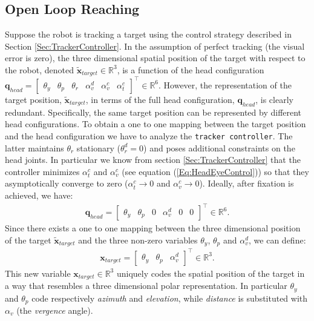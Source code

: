 \subsection{Open Loop Reaching}
%
Suppose the robot is tracking a target using the control strategy described in 
Section \ref{Sec:TrackerController}. In the assumption of perfect 
tracking (the visual error is zero), the three dimensional spatial position 
of the target with respect to the robot, denoted $\tilde {\mathbf x}_{target} 
\in \mathbb R^3$, 
is a function of the head configuration $\mathbf q_{head} =
\begin{bmatrix} \theta_y & \theta_p & \theta_r & \alpha_v^d & \alpha_v^c & \alpha_t^c \end{bmatrix}^\top \in \mathbb R^6$.
However, the representation of the target position, 
$\tilde {\mathbf x}_{target}$, in terms of the full head configuration, 
$\mathbf q_{head}$, is clearly redundant.
Specifically, the same target position can be represented by different 
head configurations. To obtain a one to one mapping between the target 
position and the head configuration we have to analyze the 
{\tt tracker controller}. The latter maintains $\theta_r$ stationary 
($\theta_r^d = 0$) and poses additional constraints on the head joints. 
In particular we know from section \ref{Sec:TrackerController} that the 
controller minimizes $\alpha_t^c$ and $\alpha^c_v$ (see equation 
(\ref{Eq:HeadEyeControl})) so that they asymptotically
converge to zero ($\alpha_t^c \rightarrow 0$ and 
$\alpha_v^c \rightarrow 0$). Ideally, after 
fixation is achieved, we have:
%
\begin{eqnarray}
{\mathbf q}_{head}=
\begin{bmatrix} \theta_y & \theta_p & 0 & \alpha_v^d & 0 & 0 \end{bmatrix}^\top \in \mathbb R^6.
\end{eqnarray}
%
Since there exists a one to one mapping between the three dimensional 
position of the target 
$\tilde {\mathbf x}_{target}$ and the three non-zero variables 
$\theta_y$, $\theta_p$ and $\alpha_v^d$, we can define:
%
\begin{eqnarray}
\mathbf x_{target}=
\begin{bmatrix} \theta_y & \theta_p & \alpha_v^d\end{bmatrix}^\top \in \mathbb R^3.
\end{eqnarray}
%
This new variable $\mathbf x_{target} \in \mathbb R^3$ uniquely codes the 
spatial position of the target in a way that resembles a three dimensional 
polar representation. In particular $\theta_y$ and $\theta_p$ code 
respectively \emph{azimuth} and \emph{elevation}, while \emph{distance} is 
substituted with $\alpha_v$ (the \emph{vergence} angle). 

